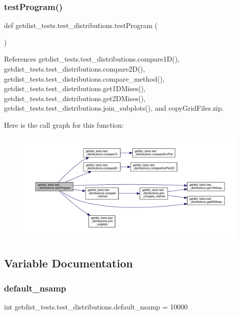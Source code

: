 \mbox{\label{namespacegetdist__tests_1_1test__distributions_a7c7ad919480f2d240e46dfcbeaa0c155}} 
\subsubsection{\texorpdfstring{test\+Program()}{testProgram()}}
{\footnotesize\ttfamily def getdist\+\_\+tests.\+test\+\_\+distributions.\+test\+Program (\begin{DoxyParamCaption}{ }\end{DoxyParamCaption})}



References getdist\+\_\+tests.\+test\+\_\+distributions.\+compare1\+D(), getdist\+\_\+tests.\+test\+\_\+distributions.\+compare2\+D(), getdist\+\_\+tests.\+test\+\_\+distributions.\+compare\+\_\+method(), getdist\+\_\+tests.\+test\+\_\+distributions.\+get1\+D\+Mises(), getdist\+\_\+tests.\+test\+\_\+distributions.\+get2\+D\+Mises(), getdist\+\_\+tests.\+test\+\_\+distributions.\+join\+\_\+subplots(), and copy\+Grid\+Files.\+zip.

Here is the call graph for this function\+:
\nopagebreak
\begin{figure}[H]
\begin{center}
\leavevmode
\includegraphics[width=350pt]{namespacegetdist__tests_1_1test__distributions_a7c7ad919480f2d240e46dfcbeaa0c155_cgraph}
\end{center}
\end{figure}


\subsection{Variable Documentation}
\mbox{\label{namespacegetdist__tests_1_1test__distributions_af66b4064706bf88e0ed5378ff868fc39}} 
\subsubsection{\texorpdfstring{default\+\_\+nsamp}{default\_nsamp}}
{\footnotesize\ttfamily int getdist\+\_\+tests.\+test\+\_\+distributions.\+default\+\_\+nsamp = 10000}

